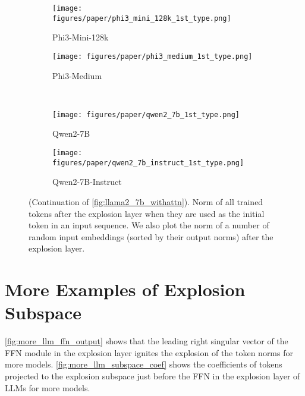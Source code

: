 \begin{figure*}[!t]
\begin{subfigure}[t]{0.47\textwidth}
        \texttt{[image: figures/paper/phi3\_mini\_128k\_1st\_type.png]}
        \caption{Phi3-Mini-128k}\label{fig:phi3_mini_128k_1st_type}
    \end{subfigure}
    \begin{subfigure}[t]{0.47\textwidth}
        \texttt{[image: figures/paper/phi3\_medium\_1st\_type.png]}
        \caption{Phi3-Medium}\label{fig:phi3_medium_1st_type}
    \end{subfigure}\\
    \begin{subfigure}[t]{0.47\textwidth}
        \texttt{[image: figures/paper/qwen2\_7b\_1st\_type.png]}
        \caption{Qwen2-7B}\label{fig:qwen2_7b_1st_type}
    \end{subfigure}
    \begin{subfigure}[t]{0.47\textwidth}
        \texttt{[image: figures/paper/qwen2\_7b\_instruct\_1st\_type.png]}
        \caption{Qwen2-7B-Instruct}\label{fig:qwen2_7b_instruct_1st_type}
    \end{subfigure}
    \caption{(Continuation of \cref{fig:llama2_7b_withattn}).
    Norm of all trained tokens after the explosion layer when they are used as the initial token in an input sequence.
    We also plot the norm of a number of random input embeddings (sorted by their output norms) after the explosion layer.
    }\label{fig:more_llm_1st_type}
\end{figure*}

\section{More Examples of Explosion Subspace}\label{sec:more_subspace}

\cref{fig:more_llm_ffn_output} shows that the leading right singular vector of the FFN module in the explosion layer ignites the explosion of the token norms for more models.
\cref{fig:more_llm_subspace_coef} shows the coefficients of tokens projected to the explosion subspace just before the FFN in the explosion layer of LLMs for more models.

